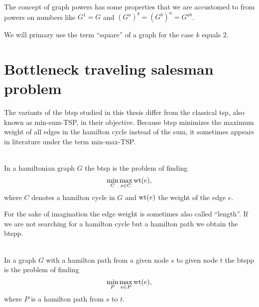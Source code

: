 The concept of graph powers has some properties that we are accustomed to from powers on numbers like \(G^1 = G\) and \({(G^a)}^b = {(G^b)}^a = G^{ab}\).

We will primary use the term \enquote{square} of a graph for the case \(k\) equals \(2\).


\section{Bottleneck traveling salesman problem}
The variants of the \ac{btsp} studied in this thesis differ from the classical \ac{tsp}, also known as min-sum-TSP, in their objective. Because \ac{btsp} minimizes the maximum weight of all edges in the hamilton cycle instead of the sum, it sometimes appears in literature under the term min-max-TSP.

\begin{definition}\label{def:btsp}\ \\
  In a hamiltonian graph \(G\) the \ac{btsp} is the problem of finding
  \begin{equation*}
    \min\limits_{C} \max\limits_{e \in C} \textrm{wt}(e),
  \end{equation*}
  where \(C\) denotes a hamilton cycle in \(G\) and \(\textrm{wt}(e)\) the weight of the edge \(e\).
\end{definition}

For the sake of imagination the edge weight is sometimes also called \enquote{length}.
If we are not searching for a hamilton cycle but a hamilton path we obtain the \ac{btspp}.

\begin{definition}\label{def:btspp}\ \\
  In a graph \(G\) with a hamilton path from a given node \(s\) to given node \(t\) the \ac{btspp} is the problem of finding
  \begin{equation*}
    \min\limits_{P} \max\limits_{e \in P} \textrm{wt}(e),
  \end{equation*}
  where \(P\) is a hamilton path from \(s\) to \(t\).
\end{definition}
